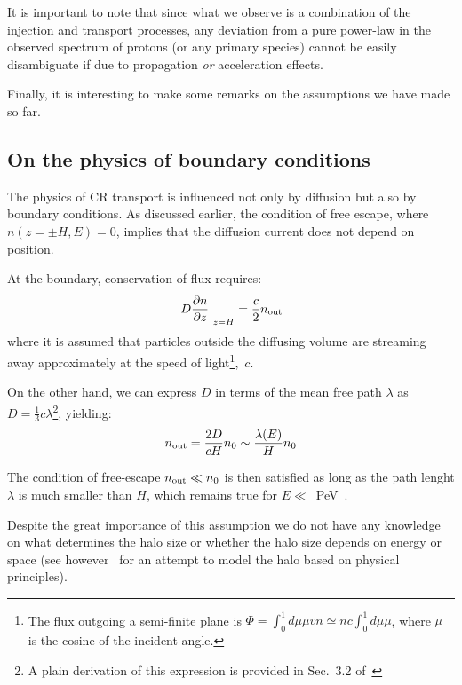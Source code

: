 It is important to note that since what we observe is a combination of the injection and transport processes, any deviation from a pure power-law in the observed spectrum of protons (or any primary species) cannot be easily disambiguate if due to propagation \emph{or} acceleration effects. 

Finally, it is interesting to make some remarks on the assumptions we have made so far.  

\subsection{On the physics of boundary conditions}

The physics of CR transport is influenced not only by diffusion but also by boundary conditions.
%
As discussed earlier, the condition of free escape, where $n(z = \pm H, E) = 0$, implies that the diffusion current does not depend on position.

At the boundary, conservation of flux requires:
%
\begin{equation}
\left. D \frac{\partial n}{\partial z} \right|_{z=H} = \frac{c}{2} n_{\rm out} %
\end{equation}
%
where it is assumed that particles outside the diffusing volume are streaming away approximately at the speed of light\footnote{The flux outgoing a semi-finite plane is $\Phi = \int_0^1 d\mu \mu v n \simeq n c \int_0^1 d\mu \mu$, where $\mu$ is the cosine of the incident angle.},~$c$.

On the other hand, we can express $D$ in terms of the mean free path $\lambda$ as $D = \frac{1}{3} c \lambda$\footnote{A plain  derivation of this expression is provided in Sec.~3.2 of~\cite{Kachelriess2008arxiv}}, yielding:
%
\begin{equation}
n_{\rm out} = \frac{2D}{cH} n_0 \sim \frac{\lambda(E)}{H} n_0 %
\end{equation}

The condition of free-escape $n_{\rm out} \ll n_0$ is then satisfied as long as the path lenght $\lambda$ is much smaller than $H$, which remains true for $E \ll $~PeV~\cite{}. 

Despite the great importance of this assumption we do not have any knowledge on what determines the halo size or whether the halo size depends on energy or space (see however~\cite{Evoli2018prl,Dogiel2020apj} for an attempt to model the halo based on physical principles).

